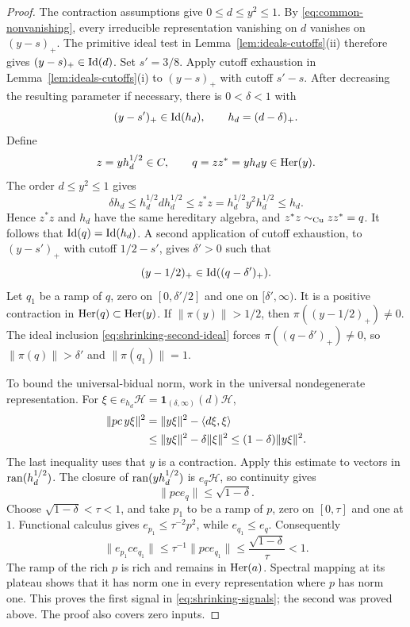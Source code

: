 \begin{proof}
The contraction assumptions give \(0\le d\le y^2\le1\).
By \eqref{eq:common-nonvanishing}, every irreducible
representation vanishing on \(d\) vanishes on \((y-s)_+\).
The primitive ideal test in Lemma~\ref{lem:ideals-cutoffs}(ii)
therefore gives \((y-s)_+\in\operatorname{Id}(d)\).  Set \(s'=3/8\).
Apply cutoff exhaustion in Lemma~\ref{lem:ideals-cutoffs}(i)
to \((y-s)_+\) with cutoff \(s'-s\).  After decreasing the
resulting parameter if necessary, there is \(0<\delta<1\) with
\begin{equation}\label{eq:shrinking-first-ideal}
 (y-s')_+\in\operatorname{Id}(h_d),\qquad h_d=(d-\delta)_+.
\end{equation}
Define
\[
 z=yh_d^{1/2}\in C,\qquad q=zz^*=y h_d y\in\operatorname{Her}(y).
\]
The order \(d\le y^2\le1\) gives
\begin{equation}\label{eq:shrinking-ideal-order}
 \delta h_d
 \le h_d^{1/2}d h_d^{1/2}
 \le z^*z=h_d^{1/2}y^2h_d^{1/2}
 \le h_d.
\end{equation}
Hence \(z^*z\) and \(h_d\) have the same hereditary algebra,
and \(z^*z\sim_{\mathrm{Cu}} zz^*=q\).  It follows that
\(\operatorname{Id}(q)=\operatorname{Id}(h_d)\).  A second application of cutoff
exhaustion, to \((y-s')_+\) with cutoff \(1/2-s'\), gives
\(\delta'>0\) such that
\begin{equation}\label{eq:shrinking-second-ideal}
 (y-1/2)_+\in\operatorname{Id}((q-\delta')_+).
\end{equation}
Let \(q_1\) be a ramp of \(q\), zero on \([0,\delta'/2]\)
and one on \([\delta',\infty)\).  It is a positive contraction
in \(\operatorname{Her}(q)\subset\operatorname{Her}(y)\).  If \(\|\pi(y)\|>1/2\),
then \(\pi((y-1/2)_+)\ne0\).  The ideal inclusion
\eqref{eq:shrinking-second-ideal} forces
\(\pi((q-\delta')_+)\ne0\), so \(\|\pi(q)\|>\delta'\)
and \(\|\pi(q_1)\|=1\).

To bound the universal-bidual norm, work in the universal
nondegenerate representation.  For
\(\xi\in e_{h_d}\mathcal H
=\mathbf1_{(\delta,\infty)}(d)\mathcal H\),
\begin{align}
 \|pc\,y\xi\|^2
 &=\|y\xi\|^2-\langle d\xi,\xi\rangle\notag\\
 &\le\|y\xi\|^2-\delta\|\xi\|^2
 \le(1-\delta)\|y\xi\|^2.
 \label{eq:shrinking-norm-loss}
\end{align}
The last inequality uses that \(y\) is a contraction.
Apply this estimate to vectors in \(\operatorname{ran}(h_d^{1/2})\).
The closure of \(\operatorname{ran}(yh_d^{1/2})\) is \(e_q\mathcal H\),
so continuity gives
\[
 \|pc e_q\|\le\sqrt{1-\delta}.
\]
Choose \(\sqrt{1-\delta}<\tau<1\), and take \(p_1\) to be a
ramp of \(p\), zero on \([0,\tau]\) and one at \(1\).
Functional calculus gives \(e_{p_1}\le\tau^{-2}p^2\),
while \(e_{q_1}\le e_q\).  Consequently
\begin{equation}\label{eq:shrinking-final-bound}
 \|e_{p_1}c e_{q_1}\|
 \le\tau^{-1}\|pc e_{q_1}\|
 \le\frac{\sqrt{1-\delta}}{\tau}<1.
\end{equation}
The ramp of the rich \(p\) is rich and remains in \(\operatorname{Her}(a)\).
Spectral mapping at its plateau shows that it has norm one in
every representation where \(p\) has norm one.  This proves
the first signal in \eqref{eq:shrinking-signals}; the second
was proved above.  The proof also covers zero inputs.
\end{proof}
